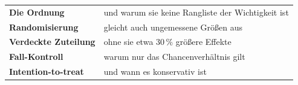 \begin{merksatz}
\begin{center}
\renewcommand{\arraystretch}{1.5}
\begin{tabular}{@{}P{3.0cm}P{5.6cm}@{}}
\toprule
\textbf{Die Ordnung} & und warum sie keine Rangliste der Wichtigkeit ist\\
\textbf{Randomisierung} & gleicht auch ungemessene Größen aus\\
\textbf{Verdeckte Zuteilung} & ohne sie etwa $30\,\%$ größere Effekte\\
\textbf{Fall-Kontroll} & warum nur das Chancenverhältnis gilt\\
\textbf{Intention-to-treat} & und wann es  konservativ ist\\
\bottomrule
\end{tabular}
\end{center}

\begin{center}
\begin{minipage}{0.88\textwidth}
\end{minipage}
\end{center}
\end{merksatz}
